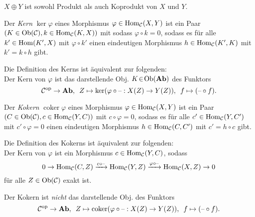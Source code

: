 \documentclass{cheat-sheet}
\DeclareMathOperator{\coker}{coker} %
\begin{document}
\begin{bem}
  $X \oplus Y$ ist sowohl Produkt als auch Koprodukt von $X$ und $Y$.
\end{bem}


\begin{defn}
  Der \emph{Kern} $\ker \varphi$ eines Morphismus $\varphi \in \operatorname{Hom}_{\mathcal{C}}(X, Y)$ ist
  ein Paar $(K \in \operatorname{Ob}(\mathcal{C}), k \in \operatorname{Hom}_{\mathcal{C}}(K, X))$ mit
  sodass $\varphi \circ k = 0$, sodass es für alle $k' \in \operatorname{Hom}(K', X)$ mit $\varphi \circ k'$ einen eindeutigen Morphismus $h \in \operatorname{Hom}_{\mathcal{C}}(K', K)$ mit $k' = k \circ h$ gibt.
\end{defn}

\begin{bem}
  Die Definition des Kerns ist äquivalent zur folgenden: \\
  Der Kern von $\varphi$ ist das darstellende Obj. $K \!\in\! \operatorname{Ob}(\mathbf{Ab})$ des Funktors
  \[
    \mathcal{C}^{\mathrm{op}} \to \mathbf{Ab}, \enspace
    Z \mapsto \ker(\varphi \circ \text{--} : X(Z) \to Y(Z)), \enspace
    f \mapsto (\text{--} \circ f).
  \]
\end{bem}


\begin{defn}
  Der \emph{Kokern} $\coker \varphi$ eines Morphismus $\varphi \in \operatorname{Hom}_{\mathcal{C}}(X, Y)$ ist ein Paar $(C \in \operatorname{Ob}(\mathcal{C}), c \in \operatorname{Hom}_{\mathcal{C}}(Y, C))$ mit $c \circ \varphi = 0$, sodass es für alle $c' \in \operatorname{Hom}_{\mathcal{C}}(Y, C')$ mit $c' \circ \varphi = 0$ einen eindeutigen Morphismus $h \in \operatorname{Hom}_{\mathcal{C}}(C, C')$ mit $c' = h \circ c$ gibt.
\end{defn}


\begin{bem}
  Die Definition des Kokerns ist äquivalent zur folgenden: \\
  Der Kern von $\varphi$ ist ein Morphismus $c \in \operatorname{Hom}_{\mathcal{C}}(Y, C)$, sodass
  \[ 0 \to \operatorname{Hom}_{\mathcal{C}}(C, Z) \xrightarrow{c \circ \text{--}} \operatorname{Hom}_{\mathcal{C}}(Y, Z) \xrightarrow{\varphi \circ \text{--}} \operatorname{Hom}_{\mathcal{C}}(X, Z) \to 0 \]
  für alle $Z \in \operatorname{Ob}(\mathcal{C})$ exakt ist.
\end{bem}

\begin{acht}
  Der Kokern ist {\em nicht} das darstellende Obj. des Funktors
  \[
    \Cat^\op \to \AbGrp, \enspace
    Z \mapsto \coker(\varphi \circ \blank : X(Z) \to Y(Z)), \enspace
    f \mapsto (\blank \circ f).
  \]
\end{acht}
\end{document}
